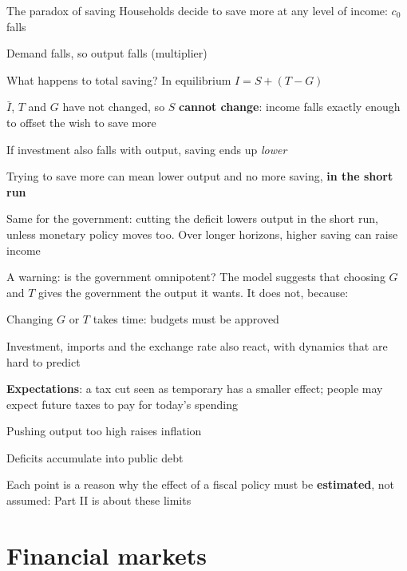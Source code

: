 \documentclass[aspectratio=169,xcolor=table]{beamer}
\begin{document}
\begin{frame}{The paradox of saving}
\footnotesize
Households decide to save more at any level of income: $c_0$ falls
\bi
  \item Demand falls, so output falls (multiplier)
  \item What happens to total saving? In equilibrium $I = S + (T-G)$
  \item $\bar I$, $T$ and $G$ have not changed, so $S$ \textbf{cannot change}: income falls exactly enough to offset the wish to save more
  \item If investment also falls with output, saving ends up \emph{lower}
\ei
\vspace{0.1cm}
\begin{block}{}
Trying to save more can mean lower output and no more saving, \textbf{in the short run}
\end{block}
\bi
  \item Same for the government: cutting the deficit lowers output in the short run, unless monetary policy moves too. Over longer horizons, higher saving can raise income
\ei
\end{frame}

\begin{frame}{A warning: is the government omnipotent?}
\footnotesize
The model suggests that choosing $G$ and $T$ gives the government the output it wants. It does not, because:
\be
  \item Changing $G$ or $T$ takes time: budgets must be approved
  \item Investment, imports and the exchange rate also react, with dynamics that are hard to predict
  \item \textbf{Expectations}: a tax cut seen as temporary has a smaller effect; people may expect future taxes to pay for today's spending
  \item Pushing output too high raises inflation
  \item Deficits accumulate into public debt
\ee
\vspace{0.1cm}
\begin{block}{}
Each point is a reason why the effect of a fiscal policy must be \textbf{estimated}, not assumed: Part II is about these limits
\end{block}
\end{frame}

\section{Financial markets}
\end{document}
